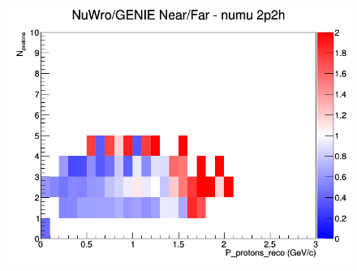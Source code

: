 \documentclass[12pt]{article}
\begin{document}
\begin{figure}[h]
\endminipage
{}
\includegraphics[width=\linewidth]{eff_N_P/FGT/protons/ratios/2p2h_NuWro_GENIE_numu_NF_N_P.png}
\endminipage
\newline
\end{figure}
\clearpage
\end{document}
